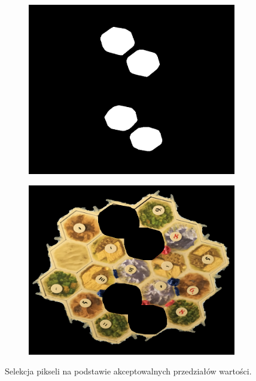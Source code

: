\documentclass[a4paper]{article}
\begin{document}
\begin{figure}[h]
\begin{subfigure}[]{0.5\linewidth}
        \end{subfigure}
		\begin{subfigure}[]{0.5\linewidth}
        \includegraphics[width=\linewidth]{pictures/fields/convex.png}
        \end{subfigure}
        \begin{subfigure}[]{0.5\linewidth}
        \includegraphics[width=\linewidth]{pictures/fields/delete_convex.png}
        \end{subfigure}
        \caption{ Selekcja pikseli na podstawie akceptowalnych przedziałów wartości.}
        \label{fig:step4}
    \end{figure}
	
\end{document}
